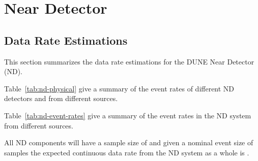 \chapter{Near Detector}
\label{ch:alt-annex-rate}

\section{Data Rate Estimations}

This section summarizes the data rate estimations for the DUNE Near
Detector (ND).

Table~\ref{tab:nd-physical} give a summary of the event rates of
different ND detectors and from different sources.





Table~\ref{tab:nd-event-rates} give a summary of the event rates in
the ND system from different sources.



All ND components will have a sample size of \ndbytesperchannel and
given a nominal event size of \ndeventsize samples the expected
continuous data rate from the ND system as a whole is \nddatarate.